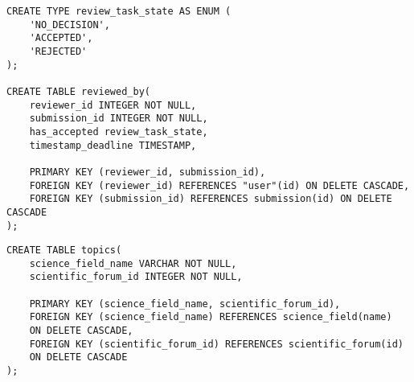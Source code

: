 \begin{lstlisting}[caption={DDL der begutachtenden Gutachter}]
CREATE TYPE review_task_state AS ENUM (
	'NO_DECISION',
	'ACCEPTED',
	'REJECTED'
);

CREATE TABLE reviewed_by(
	reviewer_id INTEGER NOT NULL,
	submission_id INTEGER NOT NULL,
	has_accepted review_task_state,
	timestamp_deadline TIMESTAMP,

	PRIMARY KEY (reviewer_id, submission_id),
	FOREIGN KEY (reviewer_id) REFERENCES "user"(id) ON DELETE CASCADE,
	FOREIGN KEY (submission_id) REFERENCES submission(id) ON DELETE CASCADE
);
\end{lstlisting}

\begin{lstlisting}[caption={DDL der Themengebiete eines Forums}]
CREATE TABLE topics(
	science_field_name VARCHAR NOT NULL,
	scientific_forum_id INTEGER NOT NULL,

	PRIMARY KEY (science_field_name, scientific_forum_id),
	FOREIGN KEY (science_field_name) REFERENCES science_field(name)
	ON DELETE CASCADE,
	FOREIGN KEY (scientific_forum_id) REFERENCES scientific_forum(id)
	ON DELETE CASCADE
);
\end{lstlisting}